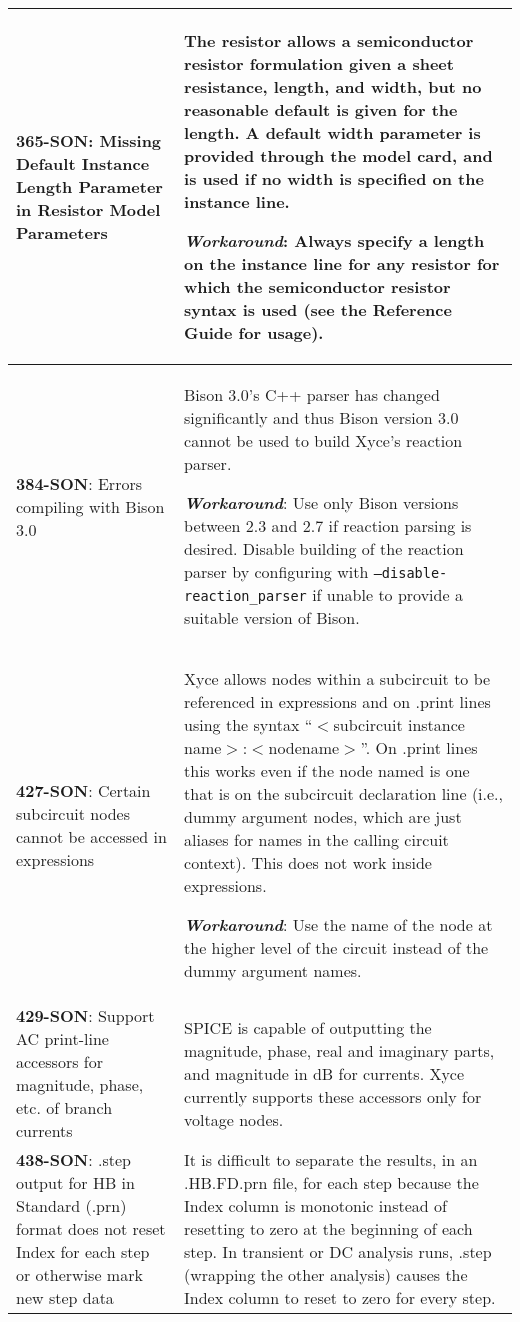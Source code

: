 \begin{longtable}[h] {>{\raggedright\small}m{2in}|>{\raggedright\let\\\tabularnewline\small}m{3.5in}}
\textbf{365-SON}: Missing Default Instance Length Parameter in Resistor Model
Parameters & The resistor allows a semiconductor resistor formulation given a
sheet resistance, length, and width, but no reasonable default is given for the
length.  A default width parameter is provided through the model card, and is
used if no width is specified on the instance line.

\textbf{\textit{Workaround}}: Always specify a length on the instance line for any
resistor for which the semiconductor resistor syntax is used (see the \Xyce{} Reference Guide for usage).
\\ \hline


\textbf{384-SON}: Errors compiling with Bison 3.0 & Bison 3.0's C++ parser has
changed significantly and thus Bison version 3.0 cannot be used to build Xyce's
reaction parser.  

\textbf{\textit{Workaround}}: Use only Bison versions between 2.3 and 2.7 if reaction
parsing is desired.  Disable building of the reaction parser by configuring with
\texttt{--disable-reaction\_parser} if unable to provide a suitable version of
Bison.
\\ \hline


\textbf{427-SON}: Certain subcircuit nodes cannot be accessed in expressions &
Xyce allows nodes within a subcircuit to be referenced in expressions and on
.print lines using the syntax ``$<$subcircuit instance
name$>$:$<$nodename$>$''.  On .print lines this works even if the node named is
one that is on the subcircuit declaration line (i.e., dummy argument nodes,
which are just aliases for names in the calling circuit context).  This does
not work inside expressions.

\textbf{\textit{Workaround}}: Use the name of the node at the higher level of the
circuit instead of the dummy argument names.
\\ \hline


\textbf{429-SON}: Support AC print-line accessors for magnitude, phase, etc. of
branch currents & SPICE is capable of outputting the magnitude, phase, real and
imaginary parts, and magnitude in dB for currents.  Xyce currently supports
these accessors only for voltage nodes.
\\ \hline


\textbf{438-SON}: .step output for HB in Standard (.prn) format does not reset
Index for each step or otherwise mark new step data &  It is difficult to separate the results, in an .HB.FD.prn file, for each step because the Index column
is monotonic instead of resetting to zero at the beginning of each step.  In transient or DC analysis runs, .step (wrapping the other analysis) causes the
Index column to reset to zero for every step.
\\ \hline



\end{longtable}
